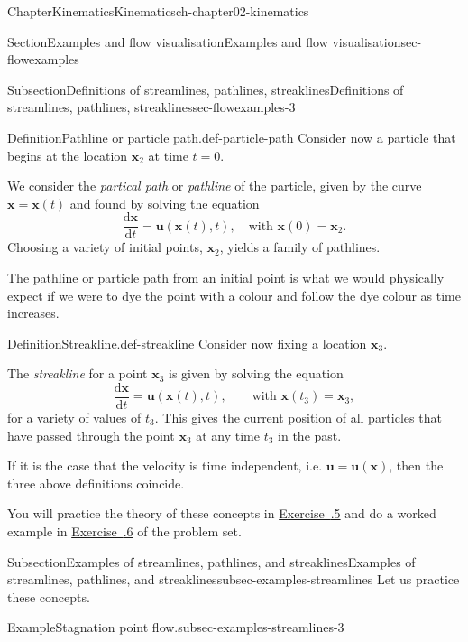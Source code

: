 \documentclass[oneside,10pt,]{book}
\newcommand{\xreffont}{\relax}
\numberwithin{equation}{section}
\newcommand{\de}{\mathrm{d}}
\newcommand{\dd}[2]{\frac{\de#1}{\de#2}}
\newcommand{\bx}{\boldsymbol{x}}
\newcommand{\bu}{\boldsymbol{u}}
\begin{document}
\begin{chapterptx}{Chapter}{Kinematics}{}{Kinematics}{}{}{ch-chapter02-kinematics}
\begin{sectionptx}{Section}{Examples and flow visualisation}{}{Examples and flow visualisation}{}{}{sec-flowexamples}
\begin{subsectionptx}{Subsection}{Definitions of streamlines, pathlines, streaklines}{}{Definitions of streamlines, pathlines, streaklines}{}{}{sec-flowexamples-3}
\begin{definition}{Definition}{Pathline or particle path.}{def-particle-path}%
Consider now a particle that begins at the location \(\bx_2\) at time \(t = 0\).%
\par
We consider the \emph{partical path} or \emph{pathline} of the particle, given by the curve \(\bx = \bx(t)\) and found by solving the equation%
\begin{equation*}
\dd{\bx}{t} = \bu(\bx(t), t), \quad \text{with $\bx(0) = \bx_2$.}
\end{equation*}
Choosing a variety of initial points, \(\bx_2\), yields a family of pathlines.%
\end{definition}
The pathline or particle path from an initial point is what we would physically expect if we were to dye the point with a colour and follow the dye colour as time increases.%
\begin{definition}{Definition}{Streakline.}{def-streakline}%
Consider now fixing a location \(\bx_3\).%
\par
The \emph{streakline} for a point \(\bx_3\) is given by solving the equation%
\begin{equation*}
\dd{\bx}{t} = \bu(\bx(t), t), \qquad \textrm{with $\bx(t_3) = \bx_3$},
\end{equation*}
for a variety of values of \(t_3\). This gives the current position of all particles that have passed through the point \(\bx_3\) at any time \(t_3\) in the past.%
\end{definition}
If it is the case that the velocity is time independent, i.e. \(\bu = \bu(\bx)\), then the three above definitions coincide.%
\par
You will practice the theory of these concepts in \hyperlink{ex-particle-paths-streamlines}{Exercise~{\xreffont 2.3.5}} and do a worked example in \hyperlink{ex-streamlines-pathlines-streaklines}{Exercise~{\xreffont 2.3.6}} of the problem set.%
\end{subsectionptx}
%
%
\typeout{************************************************}
\typeout{************************************************}
%
\begin{subsectionptx}{Subsection}{Examples of streamlines, pathlines, and streaklines}{}{Examples of streamlines, pathlines, and streaklines}{}{}{subsec-examples-streamlines}
Let us practice these concepts.%
\begin{example}{Example}{Stagnation point flow.}{subsec-examples-streamlines-3}%

\end{example}
\end{subsectionptx}
\end{sectionptx}
\end{chapterptx}
\end{document}
